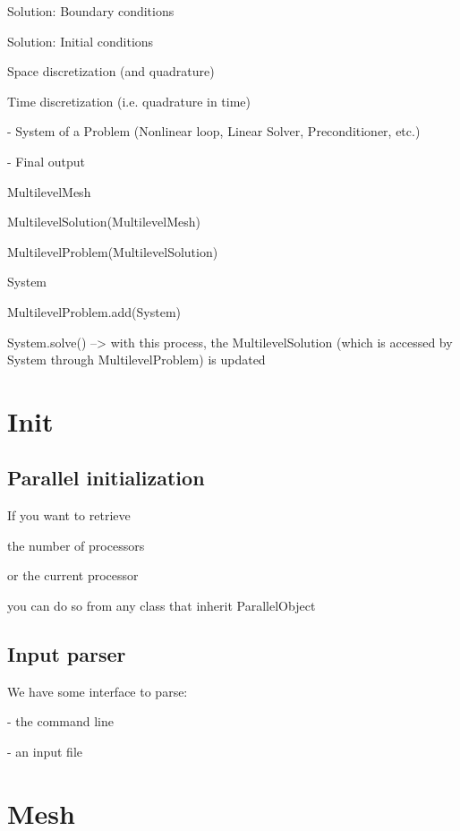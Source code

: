 \documentclass[10pt]{book}
\begin{document}
 Solution: Boundary conditions
 
 Solution: Initial conditions
 
 Space discretization (and quadrature)
 
 Time discretization (i.e. quadrature in time)
 
 - System of a Problem (Nonlinear loop, Linear Solver, Preconditioner, etc.)
 
 - Final output
 
 
 
 

  
  MultilevelMesh
  
  MultilevelSolution(MultilevelMesh)
  
   MultilevelProblem(MultilevelSolution)

   System
   
   MultilevelProblem.add(System)
   
   System.solve() --> with this process, the MultilevelSolution (which is accessed by System through MultilevelProblem) is updated
   
   
 \chapter{Init}

   \section{Parallel initialization}
   
   If you want to retrieve 
   
   the number of processors
   
   or the current processor
   
   you can do so from any class that inherit ParallelObject
   
   
   
   \section{Input parser}
   
   We have some interface to parse:
   
   - the command line
   
   - an input file
   
   
 
 
 
 \chapter{ Mesh }
\end{document}
